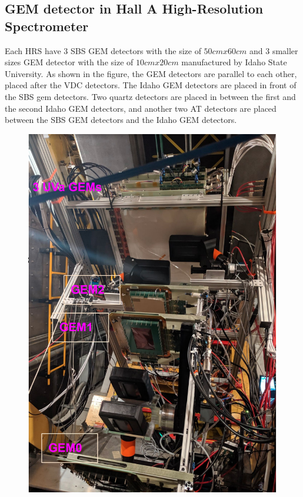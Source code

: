 \subsection{GEM detector in Hall A High-Resolution Spectrometer}

Each HRS have 3 SBS GEM detectors with the size of $50cm x 60cm$ and 3 smaller sizes GEM detector with the size of $10cm x 20cm$ manufactured by Idaho State University. As shown in the figure, the GEM detectors are parallel to each other, placed after the VDC detectors.  The Idaho GEM detectors are placed in front of the SBS gem detectors. Two quartz detectors are placed in between the first and the second Idaho GEM detectors, and another two AT detectors are placed between the SBS GEM detectors and the Idaho GEM detectors. 


\begin{figure}[!htbp]
  \centering
  \begin{minipage}[b]{0.45\textwidth}
    \includegraphics[width=\textwidth]{images/chap5/gem_in_apparatus_photo.png}

\end{minipage}
\end{figure}
